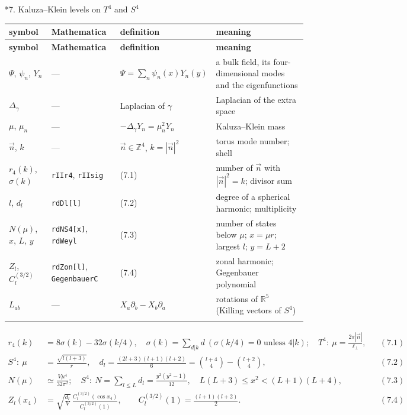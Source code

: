 \documentclass[10pt,a4paper]{article}
\makeatletter
\renewcommand\section{\@startsection{section}{1}{\z@}{-3.5ex \@plus -1ex \@minus -.2ex}{2.3ex \@plus.2ex}{\normalfont\Large\bfseries\raggedright}}
\makeatother
\begin{document}
\section*{7. Kaluza–Klein levels on \texorpdfstring{$T^4$}{T4} and \texorpdfstring{$S^4$}{S4}}
{\footnotesize
\begin{longtable}{>{\raggedright\arraybackslash}p{}>{\raggedright\arraybackslash}p{}>{\raggedright\arraybackslash}p{}>{\raggedright\arraybackslash}p{}}
\toprule
\textbf{symbol} & \textbf{Mathematica} & \textbf{definition} & \textbf{meaning} \\
\midrule\endfirsthead
\toprule
\textbf{symbol} & \textbf{Mathematica} & \textbf{definition} & \textbf{meaning} \\
\midrule\endhead
\endfoot
\bottomrule\endlastfoot
$\Psi$, $\psi_n$, $Y_n$ & — & $\Psi=\sum_n\psi_n(x)Y_n(y)$ & a bulk field, its four-dimensional modes and the eigenfunctions \\
$\Delta_\gamma$ & — & Laplacian of $\gamma$ & Laplacian of the extra space \\
$\mu$, $\mu_n$ & — & $-\Delta_\gamma Y_n=\mu_n^2Y_n$ & Kaluza–Klein mass \\
$\vec n$, $k$ & — & $\vec n\in\mathbb Z^4$, $k=|\vec n|^2$ & torus mode number; shell \\
$r_4(k)$, $\sigma(k)$ & \texttt{rIIr4}, \texttt{rIIsig} & (7.1) & number of $\vec n$ with $|\vec n|^2=k$; divisor sum \\
$l$, $d_l$ & \texttt{rdDl[l]} & (7.2) & degree of a spherical harmonic; multiplicity \\
$N(\mu)$, $x$, $L$, $y$ & \texttt{rdNS4[x]}, \texttt{rdWeyl} & (7.3) & number of states below $\mu$; $x=\mu r$; largest $l$; $y=L+2$ \\
$Z_l$, $C_l^{(3/2)}$ & \texttt{rdZon[l]}, \texttt{GegenbauerC} & (7.4) & zonal harmonic; Gegenbauer polynomial \\
$L_{ab}$ & — & $X_a\partial_b-X_b\partial_a$ & rotations of $\mathbb R^5$ (Killing vectors of $S^4$) \\*
\end{longtable}}
\begin{align*}
r_4(k)&=8\sigma(k)-32\sigma(k/4),\quad \sigma(k)=\sum_{d|k}d\ (\sigma(k/4)=0\text{ unless }4|k);\quad T^4:\ \mu=\frac{2\pi|\vec n|}{\ell_\perp},&&(7.1) \\
S^4:\ \mu&=\frac{\sqrt{l(l+3)}}r,\quad d_l=\frac{(2l+3)(l+1)(l+2)}6=\binom{l+4}4-\binom{l+2}4,&&(7.2) \\
N(\mu)&\simeq\frac{V\mu^4}{32\pi^2};\quad S^4:\ N=\sum_{l\le L}d_l=\frac{y^2(y^2-1)}{12},\quad L(L+3)\le x^2<(L+1)(L+4),&&(7.3) \\
Z_l(x_4)&=\sqrt{\frac{d_l}V}\,\frac{C_l^{(3/2)}(\cos x_4)}{C_l^{(3/2)}(1)},\qquad C_l^{(3/2)}(1)=\frac{(l+1)(l+2)}2.&&(7.4)
\end{align*}
\end{document}
